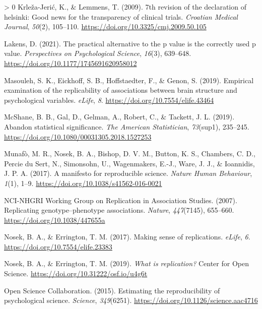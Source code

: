 \documentclass[]{cik}%
\newlength{\cslhangindent}
\newenvironment{CSLReferences}[3] %
 {%
  \setlength{\parindent}{0pt}
  \ifodd #1 \everypar{\setlength{\hangindent}{\cslhangindent}}\ignorespaces\fi
  \ifnum #2 > 0
  \setlength{\parskip}{#2\baselineskip}
  \fi
 }%
 {}
\begin{document}
\begin{CSLReferences}{1}{0}
\leavevmode\hypertarget{ref-KrleaJeri2009}{}%
Krleža-Jerić, K., \& Lemmens, T. (2009). 7th revision of the declaration
of helsinki: Good news for the transparency of clinical trials.
\emph{Croatian Medical Journal}, \emph{50}(2), 105--110.
\url{https://doi.org/10.3325/cmj.2009.50.105}

\leavevmode\hypertarget{ref-Lakens2021pvalue}{}%
Lakens, D. (2021). The practical alternative to the p value is the
correctly used p value. \emph{Perspectives on Psychological Science},
\emph{16}(3), 639--648. \url{https://doi.org/10.1177/1745691620958012}

\leavevmode\hypertarget{ref-Kharabian_Genon_2019}{}%
Masouleh, S. K., Eickhoff, S. B., Hoffstaedter, F., \& Genon, S. (2019).
Empirical examination of the replicability of associations between brain
structure and psychological variables. \emph{eLife}, \emph{8}.
\url{https://doi.org/10.7554/elife.43464}

\leavevmode\hypertarget{ref-mcshane2019abandon}{}%
McShane, B. B., Gal, D., Gelman, A., Robert, C., \& Tackett, J. L.
(2019). Abandon statistical significance. \emph{The American
Statistician}, \emph{73}(sup1), 235--245.
\url{https://doi.org/10.1080/00031305.2018.1527253}

\leavevmode\hypertarget{ref-munafo_manifesto_2017}{}%
Munafò, M. R., Nosek, B. A., Bishop, D. V. M., Button, K. S., Chambers,
C. D., Percie du Sert, N., Simonsohn, U., Wagenmakers, E.-J., Ware, J.
J., \& Ioannidis, J. P. A. (2017). A manifesto for reproducible science.
\emph{Nature Human Behaviour}, \emph{1}(1), 1--9.
\url{https://doi.org/10.1038/s41562-016-0021}

\leavevmode\hypertarget{ref-chanock_2007}{}%
NCI-NHGRI Working Group on Replication in Association Studies. (2007).
Replicating genotype--phenotype associations. \emph{Nature},
\emph{447}(7145), 655--660. \url{https://doi.org/10.1038/447655a}

\leavevmode\hypertarget{ref-Nosek_Errington_2017}{}%
Nosek, B. A., \& Errington, T. M. (2017). Making sense of replications.
\emph{eLife}, \emph{6}. \url{https://doi.org/10.7554/elife.23383}

\leavevmode\hypertarget{ref-NosekErrington2019}{}%
Nosek, B. A., \& Errington, T. M. (2019). \emph{What is replication?}
Center for Open Science. \url{https://doi.org/10.31222/osf.io/u4g6t}

\leavevmode\hypertarget{ref-collaboration_estimating_2015}{}%
Open Science Collaboration. (2015). Estimating the reproducibility of
psychological science. \emph{Science}, \emph{349}(6251).
\url{https://doi.org/10.1126/science.aac4716}


\end{CSLReferences}
\end{document}
